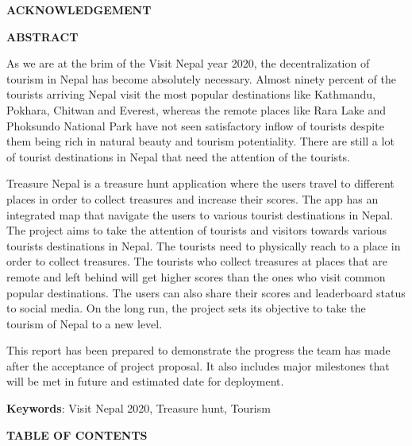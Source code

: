 \documentclass[12pt, a4paper, oneside]{article}
\begin{document}

\large
\begin{center}
	\textbf{ACKNOWLEDGEMENT}
\end{center}

\normalsize
\vspace{40px}
\lipsum[2]

\break

\large
\begin{center}
	\textbf{ABSTRACT}
\end{center}

\normalsize
As we are at the brim of the Visit Nepal year 2020, the decentralization of tourism in Nepal has become absolutely necessary. Almost ninety percent of the tourists arriving Nepal visit the most popular destinations like Kathmandu, Pokhara, Chitwan and Everest, whereas the remote places like Rara Lake and Phoksundo National Park have not seen satisfactory inflow of tourists despite them being rich in natural beauty and tourism potentiality. There are still a lot of tourist destinations in Nepal that need the attention of the tourists.

Treasure Nepal is a treasure hunt application where the users travel to different places in order to collect treasures and increase their scores. The app has an integrated map that navigate the users to various tourist destinations in Nepal. The project aims to take the attention of tourists and visitors towards various tourists destinations in Nepal. The tourists need to physically reach to a place in order to collect treasures. The tourists who collect treasures at places that are remote and left behind will get higher scores than the ones who visit common popular destinations. The users can also share their scores and leaderboard status to social media. On the long run, the project sets its objective to take the tourism of Nepal to a new level.

This report has been prepared to demonstrate the progress the team has made after the acceptance of project proposal. It also includes major milestones that will be met in future and estimated date for deployment.

\textbf{Keywords}: Visit Nepal 2020, Treasure hunt, Tourism\\

\break

\large
{}
\begin{center}
	\textbf{TABLE OF CONTENTS}
\end{center}
\end{document}
